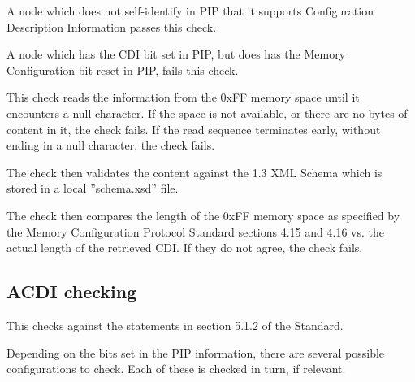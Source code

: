 A node which does not self-identify in PIP that it supports
Configuration Description Information passes this check.

A node which has the CDI bit set in PIP, but does
has the Memory Configuration bit reset in PIP, fails this check.
\pipsetFootnote

This check reads the information from the 0xFF memory space
until it encounters a null character.
If the space is not available, or there are no bytes of content in it, the check fails.
If the read sequence terminates early, without ending in a null character, the check fails.
 
The check then validates the content against the 1.3 XML Schema
which is stored in a local ”schema.xsd” file.

The check then compares the length of the 0xFF memory space 
as specified by the Memory Configuration Protocol Standard sections 4.15 and 4.16
vs. the actual length of the retrieved CDI.
If they do not agree, the check fails.

\subsection{ACDI checking}

This checks against the statements in section 5.1.2 of the Standard.

Depending on the bits set in the PIP information, there are several 
possible configurations to check. Each of these is checked in turn, if relevant.


